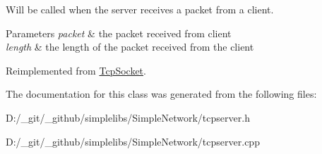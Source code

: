 Will be called when the server receives a packet from a client. 


\begin{DoxyParams}{Parameters}
{\em packet} & the packet received from client \\
\hline
{\em length} & the length of the packet received from the client \\
\hline
\end{DoxyParams}


Reimplemented from \mbox{\hyperlink{class_tcp_socket_a5c3aedf1e5387e02204d423e39dd6bee}{Tcp\+Socket}}.



The documentation for this class was generated from the following files\+:\begin{DoxyCompactItemize}
\item 
D\+:/\+\_\+git/\+\_\+github/simplelibs/\+Simple\+Network/tcpserver.\+h\item 
D\+:/\+\_\+git/\+\_\+github/simplelibs/\+Simple\+Network/tcpserver.\+cpp\end{DoxyCompactItemize}
